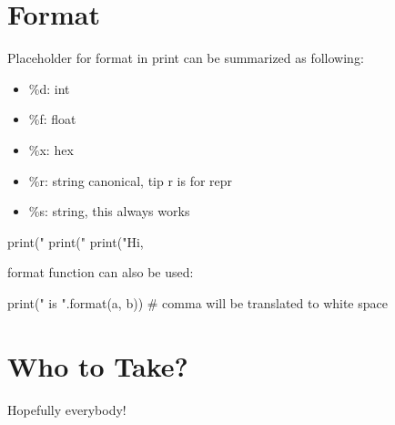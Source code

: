 \documentclass[10pt,a4paper,oneside]{article}
\begin{document}
\section{Format}
Placeholder for format in print can be summarized as following:
\begin{itemize}
	\item \%d: int
	\item \%f: float
	\item \%x: hex
	\item \%r: string canonical, tip r is for repr
	\item \%s: string, this always works
\end{itemize}
\begin{python}
	print("%
	print("%
	print("Hi, %
\end{python}
format function  can also be used:
\begin{python}
	print("{} is {}".format(a, b))  # comma will be translated to white space
\end{python}



\section{Who to Take?}
Hopefully everybody!
\end{document}
